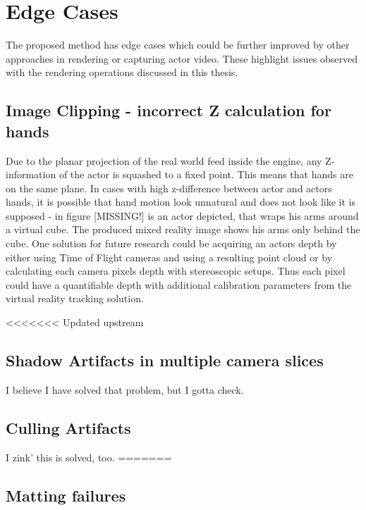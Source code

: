 \section{Edge Cases}

The proposed method has edge cases which could be further improved by other 
approaches in rendering or capturing actor video. These highlight issues 
observed with the rendering operations discussed in this thesis.

\subsection{Image Clipping - incorrect Z calculation for hands}

Due to the planar projection of the real world feed inside the engine, any 
Z-information of the actor is squashed to a fixed point. This means that hands 
are on the same plane. In cases with high z-difference between actor and actors 
hands, it is possible that hand motion look unnatural and does not look like it 
is supposed - in figure [MISSING!] is an actor depicted, that wraps his arms 
around a virtual cube. The produced mixed reality image shows his arms only 
behind the cube.
One solution for future research could be acquiring an actors depth by either 
using Time of Flight cameras and using a resulting point cloud or by 
calculating each camera pixels depth with stereoscopic setups. Thus each pixel 
could have a quantifiable depth with additional calibration parameters from the 
virtual reality tracking solution.

<<<<<<< Updated upstream
\subsection{Shadow Artifacts in multiple camera slices}

I believe I have solved that problem, but I gotta check.

\subsection{Culling Artifacts}

I zink' this is solved, too.
=======
\subsection{Matting failures}

